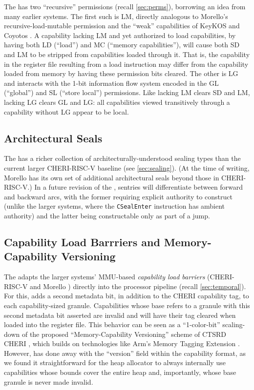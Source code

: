 The \cherimcuisa{} has two ``recursive'' permissions (recall \cref{sec:perms}), borrowing an idea from many earlier systems.
%
The first such is LM, directly analogous to Morello's recursive-load-mutable permission \cite[\S 2.7.4]{arm-morello} and the ``weak'' capabilities of KeyKOS and Coyotos \cite{hardy:keykos,doerrie2015:confinement,shapiro:coyotosspec}.
A capability lacking LM and yet authorized to load capabilities, by having both LD (``load'') and MC (``memory capabilities''), will cause both SD and LM to be stripped from capabilities loaded through it.
That is, the capability in the register file resulting from a load instruction may differ from the capability loaded from memory by having these permission bits cleared.
%
The other is LG and interacts with the 1-bit information flow system encoded in the GL (``global'') and SL (``store local'') permissions. 
Like lacking LM clears SD and LM, lacking LG clears GL and LG: all capabilities viewed transitively through a capability without LG appear to be local.

\subsection{Architectural Seals}

The \cherimcuisa{} has a richer collection of architecturally-understood sealing types than the current larger CHERI-RISC-V baseline (see \cref{sec:sealing}).
(At the time of writing, Morello has its own set of additional architectural seals beyond those in CHERI-RISC-V.)
%
In a future revision of the \cherimcuisa{}, sentries will differentiate between forward and backward arcs, with the former requiring explicit authority to construct (unlike the larger systems, where the \texttt{CSealEnter} instruction has ambient authority) and the latter being constructable only as part of a jump.

\subsection{Capability Load Barrriers and Memory-Capability Versioning}

The \cherimcuisa{} adapts the larger systems' MMU-based \emph{capability load barriers} (CHERI-RISC-V \cite[\S 5.3.10]{UCAM-CL-TR-951} and Morello \cite[$\text{R}_\text{CPRKD}$ in \S 2.14]{arm-morello}) directly into the processor pipeline (recall \cref{sec:temporal}).
For this, \cherimcu{} adds a second metadata bit, in addition to the CHERI capability tag, to each capability-sized granule.
Capabilities whose base refers to a granule with this second metadata bit asserted are invalid and will have their tag cleared when loaded into the register file.
This behavior can be seen as a ``1-color-bit'' scaling-down of the proposed ``Memory-Capability Versioning'' scheme of CTSRD CHERI \cite[\S D.6]{UCAM-CL-TR-951}, which builds on technologies like Arm's Memory Tagging Extension \cite{arm:mte}.
However, \cherimcu{} has done away with the ``version'' field within the capability format, as we found it straightforward for the heap allocator to always internally use capabilities whose bounds cover the entire heap and, importantly, whose base granule is never made invalid.

